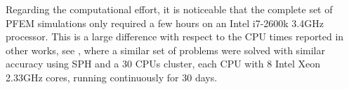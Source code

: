 Regarding the computational effort, it is noticeable that the complete set of PFEM simulations only required a few hours on an Intel i7-2600k 3.4GHz processor. This is a large difference with respect to the CPU times reported in other works, see \cite{Colagrossi12}, where a similar set of problems were solved with similar accuracy using SPH and a 30 CPUs cluster, each CPU with 8 Intel Xeon 2.33GHz cores, running continuously for 30 days. 